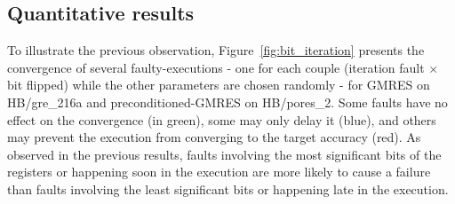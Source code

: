 \subsection{Quantitative results}

To illustrate the previous observation, Figure~\ref{fig:bit_iteration} presents the convergence of several faulty-executions - one for each couple (iteration fault $\times$ bit flipped) while the other parameters are chosen randomly - for GMRES on HB/gre_216a and preconditioned-GMRES on HB/pores_2. Some faults have no effect on the convergence (in green), some may only delay it (blue), and others may prevent the execution from converging to the target accuracy (red). As observed in the previous results, faults involving the most significant bits of the registers or happening soon in the execution are more likely to cause a failure than faults involving the least significant bits or happening late in the execution.






